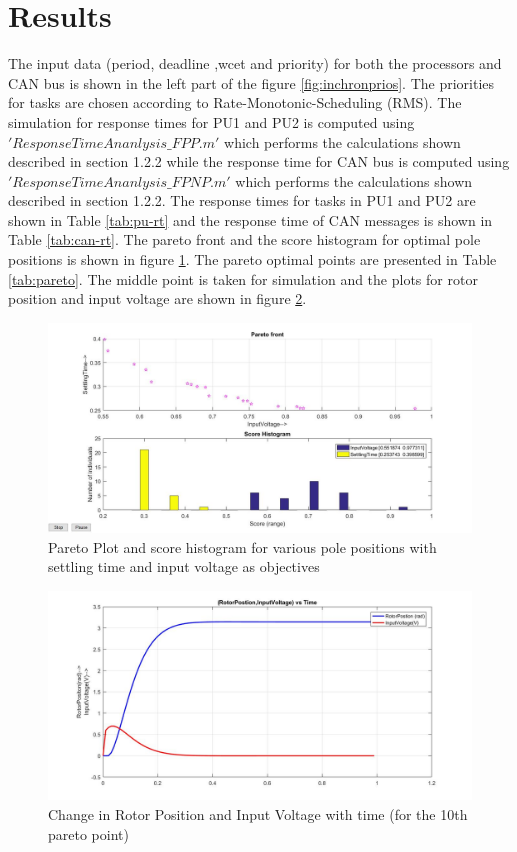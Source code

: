 \section{Results}
The input data (period, deadline ,wcet and priority) for both the processors and CAN bus is shown in the left part of the figure \ref{fig:inchronprios}. The priorities for tasks are chosen according to Rate-Monotonic-Scheduling (RMS).  The simulation for response times for PU1 and PU2 is computed using $'ResponseTimeAnanlysis\_FPP.m'$ which performs the calculations shown described in section 1.2.2 while the response time for CAN bus is computed using $'ResponseTimeAnanlysis\_FPNP.m'$ which performs the calculations shown described in section 1.2.2. The response times for tasks in PU1 and PU2 are shown in Table \ref{tab:pu-rt} and the response time of CAN messages is shown in Table \ref{tab:can-rt}. The pareto front and the score histogram for optimal pole positions is shown in figure \ref{fig:pareto}. The pareto optimal points are presented in Table \ref{tab:pareto}. The middle point is taken for simulation and the plots for rotor position and input voltage are shown in figure \ref{fig:rv}.
\begin{figure}[h!]
	\begin{center}
		\includegraphics[width=\linewidth]{img/pareto}
		\caption{Pareto Plot and score histogram for various pole positions with settling time and input voltage as objectives}
		\label{fig:pareto}
	\end{center}
\end{figure}

\begin{figure}[h!]
	\begin{center}
		\includegraphics[width=\linewidth]{img/rv}
		\caption{Change in Rotor Position and Input Voltage with time (for the 10th pareto point)}
		\label{fig:rv}
	\end{center}
\end{figure}

